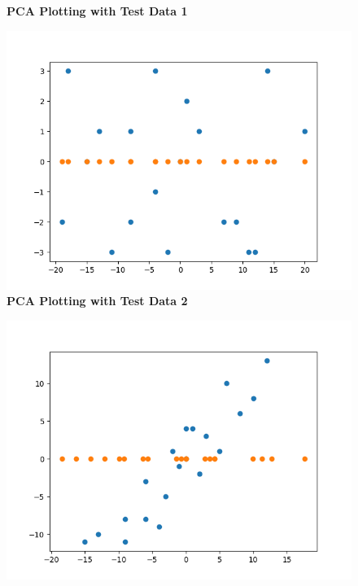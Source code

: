 \documentclass{article}
\begin{document}
\begin{figure}[!htb]
    \centering
    \textbf{PCA Plotting with Test Data 1}\par
    \includegraphics[width=14cm]{Images/test_data_1_plot.jpg}
    \newline
    \textbf{PCA Plotting with Test Data 2}\par
    \includegraphics[width=14cm]{Images/test_data_2_plot.jpg}
\end{figure}
\end{document}
